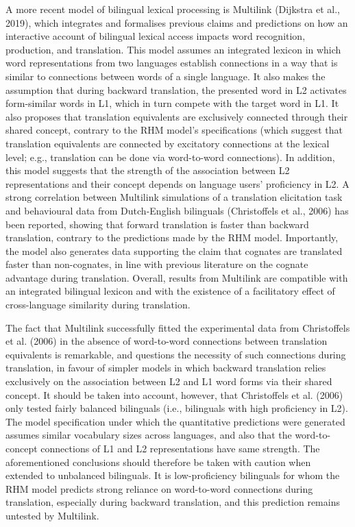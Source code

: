 \documentclass[
  english,
  man,floatsintext]{apa7}
\begin{document}
A more recent model of bilingual lexical processing is Multilink (Dijkstra et al., 2019), which integrates and formalises previous claims and predictions on how an interactive account of bilingual lexical access impacts word recognition, production, and translation. This model assumes an integrated lexicon in which word representations from two languages establish connections in a way that is similar to connections between words of a single language. It also makes the assumption that during backward translation, the presented word in L2 activates form-similar words in L1, which in turn compete with the target word in L1. It also proposes that translation equivalents are exclusively connected through their shared concept, contrary to the RHM model's specifications (which suggest that translation equivalents are connected by excitatory connections at the lexical level; e.g., translation can be done via word-to-word connections). In addition, this model suggests that the strength of the association between L2 representations and their concept depends on language users' proficiency in L2. A strong correlation between Multilink simulations of a translation elicitation task and behavioural data from Dutch-English bilinguals (Christoffels et al., 2006) has been reported, showing that forward translation is faster than backward translation, contrary to the predictions made by the RHM model. Importantly, the model also generates data supporting the claim that cognates are translated faster than non-cognates, in line with previous literature on the cognate advantage during translation. Overall, results from Multilink are compatible with an integrated bilingual lexicon and with the existence of a facilitatory effect of cross-language similarity during translation.

The fact that Multilink successfully fitted the experimental data from Christoffels et al. (2006) in the absence of word-to-word connections between translation equivalents is remarkable, and questions the necessity of such connections during translation, in favour of simpler models in which backward translation relies exclusively on the association between L2 and L1 word forms via their shared concept. It should be taken into account, however, that Christoffels et al. (2006) only tested fairly balanced bilinguals (i.e., bilinguals with high proficiency in L2). The model specification under which the quantitative predictions were generated assumes similar vocabulary sizes across languages, and also that the word-to-concept connections of L1 and L2 representations have same strength. The aforementioned conclusions should therefore be taken with caution when extended to unbalanced bilinguals. It is low-proficiency bilinguals for whom the RHM model predicts strong reliance on word-to-word connections during translation, especially during backward translation, and this prediction remains untested by Multilink.
\end{document}
